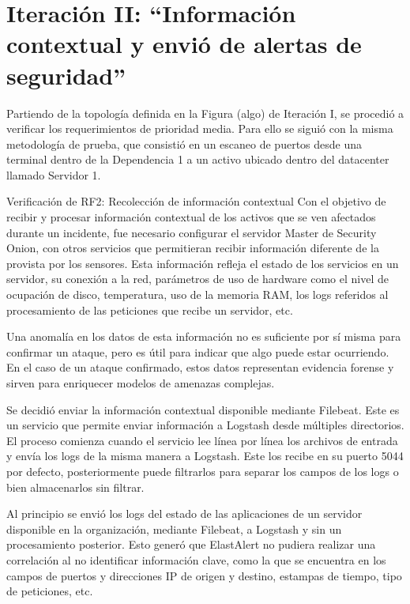 \chapter{\Large Iteración II: “Información contextual y envió de alertas de seguridad”}
    Partiendo de la topología definida en la Figura (algo) de Iteración I, se procedió a verificar los requerimientos de prioridad media. Para ello se siguió con la misma metodología de prueba, que consistió en un escaneo de puertos desde una terminal dentro de la Dependencia 1 a un activo ubicado dentro del datacenter llamado Servidor 1.
    \begin{section}{Verificación de RF2: Recolección de información contextual}
    Con el objetivo de recibir y procesar información contextual de los activos que se ven afectados durante un incidente, fue necesario configurar el servidor Master de Security Onion, con otros servicios que permitieran recibir información diferente de la provista por los sensores. Esta información refleja el estado de los servicios en un servidor, su conexión a la red, parámetros de uso de hardware como el nivel de ocupación de disco, temperatura, uso de la memoria RAM, los logs referidos al procesamiento de las peticiones que recibe un servidor, etc. \par
     Una anomalía en los datos de esta información no es suficiente por sí misma para confirmar un ataque, pero es útil para indicar que algo puede estar ocurriendo. En el caso de un ataque confirmado, estos datos representan evidencia forense y sirven para enriquecer modelos de amenazas complejas. \par
     Se decidió enviar la información contextual disponible mediante Filebeat. Este es un servicio que permite enviar información a Logstash desde múltiples directorios. El proceso comienza cuando el servicio lee línea por línea los archivos de entrada y envía los logs de la misma manera a Logstash. Este los recibe en su puerto 5044 por defecto, posteriormente puede filtrarlos para separar los campos de los logs o bien almacenarlos sin filtrar. \par
     Al principio se envió los logs del estado de las aplicaciones de un servidor disponible en la organización, mediante Filebeat, a Logstash y sin un procesamiento posterior. Esto generó que ElastAlert no pudiera realizar una correlación al no identificar información clave, como la que se encuentra en los campos de puertos y direcciones IP de origen y destino, estampas de tiempo, tipo de peticiones, etc.\par

\end{section}
